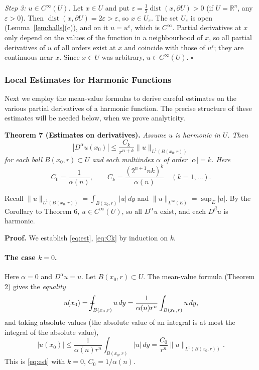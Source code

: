 \documentclass[11pt]{article}
\def\Xint#1{\mathchoice
  {\XXint\displaystyle\textstyle{#1}}%
  {\XXint\textstyle\scriptstyle{#1}}%
  {\XXint\scriptstyle\scriptscriptstyle{#1}}%
  {\XXint\scriptscriptstyle\scriptscriptstyle{#1}}%
  \!\int}
\def\XXint#1#2#3{{\setbox0=\hbox{$#1{#2#3}{\int}$}
  \vcenter{\hbox{$#2#3$}}\kern-.5\wd0}}
\def\fint{\Xint-}
\theoremstyle{plain}
\theoremstyle{definition}
\theoremstyle{remark}
\begin{document}
\emph{Step 3: $u \in C^\infty(U)$.} Let $x \in U$ and put $\varepsilon = \frac12\operatorname{dist}(x,\partial U) > 0$ (if $U = \mathbb{R}^n$, any $\varepsilon > 0$). Then $\operatorname{dist}(x,\partial U) = 2\varepsilon > \varepsilon$, so $x \in U_\varepsilon$. The set $U_\varepsilon$ is open (Lemma~\ref{lem:balls}(c)), and on it $u = u^\varepsilon$, which is $C^\infty$. Partial derivatives at $x$ only depend on the values of the function in a neighbourhood of $x$, so all partial derivatives of $u$ of all orders exist at $x$ and coincide with those of $u^\varepsilon$; they are continuous near $x$. Since $x \in U$ was arbitrary, $u \in C^\infty(U)$. $\square$

\subsubsection{Local Estimates for Harmonic Functions}
Next we employ the mean-value formulas to derive careful estimates on the various partial derivatives of a harmonic function. The precise structure of these estimates will be needed below, when we prove analyticity.

\textbf{Theorem 7 (Estimates on derivatives).} \textit{Assume $u$ is harmonic in $U$. Then}
\begin{equation}\label{eq:est}
|D^\alpha u(x_0)| \leq \frac{C_k}{r^{n+k}}\|u\|_{L^1(B(x_0,r))}
\end{equation}
\textit{for each ball $B(x_0,r) \subset U$ and each multiindex $\alpha$ of order $|\alpha| = k$. Here}
\begin{equation}\label{eq:Ck}
C_0 = \frac{1}{\alpha(n)}, \qquad C_k = \frac{(2^{n+1}nk)^k}{\alpha(n)} \quad (k = 1, \dots).
\end{equation}

Recall $\|u\|_{L^1(B(x_0,r))} = \int_{B(x_0,r)}|u|\, dy$ and $\|u\|_{L^\infty(E)} = \sup_E|u|$. By the Corollary to Theorem 6, $u \in C^\infty(U)$, so all $D^\alpha u$ exist, and each $D^\beta u$ is harmonic.

\textbf{Proof.} We establish \eqref{eq:est}, \eqref{eq:Ck} by induction on $k$.

\paragraph{The case $k = 0$.} Here $\alpha = 0$ and $D^\alpha u = u$. Let $B(x_0,r) \subset U$. The mean-value formula (Theorem 2) gives the \emph{equality}
$$ u(x_0) = \fint_{B(x_0,r)} u\, dy = \frac{1}{\alpha(n) r^n}\int_{B(x_0,r)} u\, dy, $$
and taking absolute values (the absolute value of an integral is at most the integral of the absolute value),
$$ |u(x_0)| \leq \frac{1}{\alpha(n)r^n}\int_{B(x_0,r)} |u|\, dy = \frac{C_0}{r^{n}}\|u\|_{L^1(B(x_0,r))}. $$
This is \eqref{eq:est} with $k = 0$, $C_0 = 1/\alpha(n)$.
\end{document}
